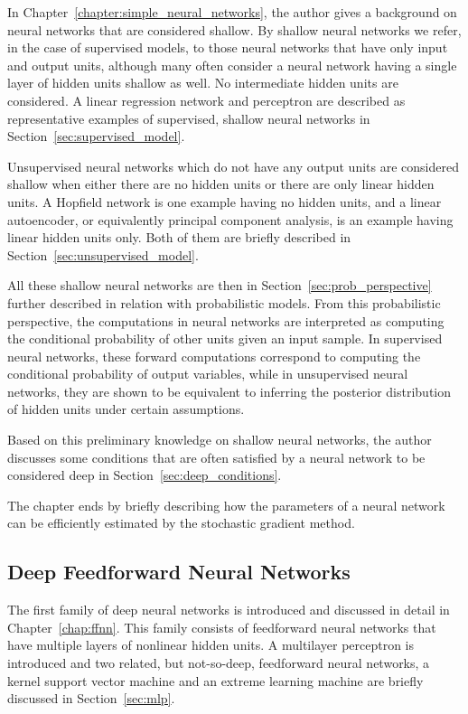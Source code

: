 \documentclass{now}
\begin{document}
In Chapter~\ref{chapter:simple_neural_networks}, the author
gives a background on neural networks that are
considered shallow. By shallow neural networks we refer, in
the case of supervised models, to those neural networks that
have only input and output units, although many often
consider a neural network having a single layer of hidden
units shallow as well. No intermediate hidden units are
considered. A linear regression network and
perceptron are described as representative examples
of supervised, shallow neural networks in
Section~\ref{sec:supervised_model}.

Unsupervised neural networks which do not have any output
units are considered shallow when either there are no hidden
units or there are only linear hidden units. A
Hopfield network is one example having no hidden
units, and a linear autoencoder, or equivalently
principal component analysis, is an example having linear
hidden units only. Both of them are briefly described in
Section~\ref{sec:unsupervised_model}.

All these shallow neural networks are then in
Section~\ref{sec:prob_perspective} further described in
relation with probabilistic models. From this probabilistic
perspective, the computations in neural networks are
interpreted as computing the conditional probability of other
units given an input sample. In supervised neural networks,
these forward computations correspond to computing the
conditional probability of output variables, while in
unsupervised neural networks, they are shown to be
equivalent to inferring the posterior distribution of hidden
units under certain assumptions.

Based on this preliminary knowledge on shallow neural
networks, the author discusses some 
conditions 
that are often satisfied by a neural network to
be considered deep in
Section~\ref{sec:deep_conditions}. 

The chapter ends by briefly describing how the
parameters of a neural network can be efficiently estimated
by the stochastic gradient method.

\subsection{Deep Feedforward Neural Networks}

The first family of deep neural networks is introduced and
discussed in detail in Chapter~\ref{chap:ffnn}. This family
consists of feedforward neural networks that have multiple
layers of nonlinear hidden units.  A multilayer
perceptron is introduced and two related, but not-so-deep,
feedforward neural networks, a kernel support
vector machine and an extreme learning machine are
briefly discussed in Section~\ref{sec:mlp}.
\end{document}
